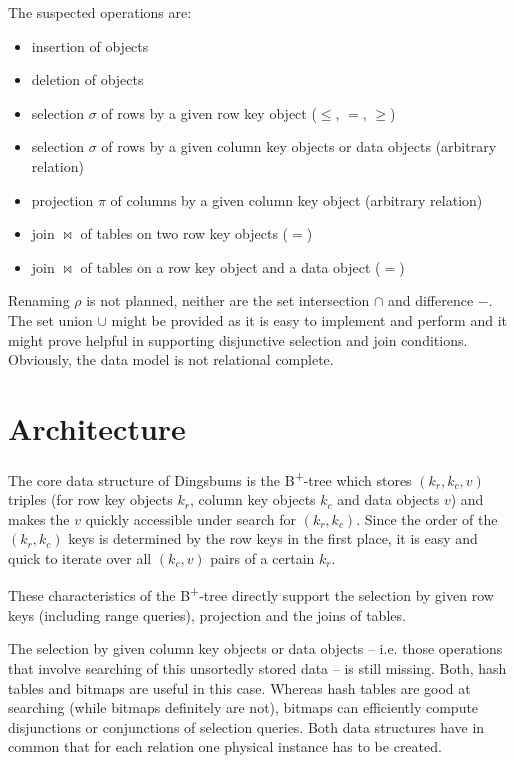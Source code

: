 \documentclass[a4paper, 9pt]{scrartcl}
\theoremstyle{plain}
\theoremstyle{definition}
\theoremstyle{remark}
\begin{document}
\begin{multicols}{2}
The suspected operations are:
\begin{itemize}
\item insertion of objects
\item deletion of objects
\item selection $\sigma$ of rows by a given row key object ($\leq$, $=$, $\geq$)
\item selection $\sigma$ of rows by a given column key objects or data objects 
	(arbitrary relation)
\item projection $\pi$ of columns by a given column key object
	(arbitrary relation)
\item join $\bowtie$ of tables on two row key objects ($=$)
\item join $\bowtie$ of tables on a row key object and a data object ($=$)
\end{itemize}
Renaming $\rho$ is not planned, neither are the set intersection $\cap$ and
difference $-$. The set union $\cup$ might be provided as it is easy to 
implement and perform and it might prove helpful in supporting disjunctive
selection and join conditions.
Obviously, the data model is {not relational complete}.



\section{Architecture} \label{sec:arch}
The core data structure of Dingsbums is the B\textsuperscript{+}-tree
which stores $(k_r, k_c, v)$ triples (for row key objects $k_r$, column key
objects $k_c$ and data objects $v$) and makes the $v$ quickly accessible under
search for $(k_r, k_c)$.
Since the order of the $(k_r, k_c)$ keys is determined by the row keys in
the first place, it is easy and quick to iterate over all $(k_c, v)$ pairs
of a certain $k_r$.

These characteristics of the B\textsuperscript{+}-tree directly support
the selection by given row keys (including range queries), projection and the 
joins of tables.

The selection by given column key objects or data objects -- i.e. those
operations that involve searching of this unsortedly stored data -- is
still missing.
Both, hash tables and bitmaps are useful in this case.
Whereas hash tables are good at searching (while bitmaps definitely are not),
bitmaps can efficiently compute disjunctions or conjunctions of selection
queries. Both data structures have in common that for each relation one
physical instance has to be created.


\end{multicols}
\end{document}
